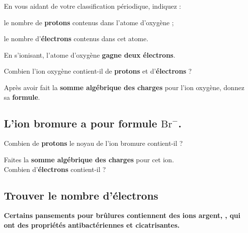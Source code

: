 \documentclass[a4paper,12pt]{article}
\begin{document}
\begin{compactitem}
  \item En vous aidant de votre classification périodique, indiquez :
  \begin{compactitem}
    \item le nombre de \textbf{protons} contenus dans l’atome d’oxygène ;
    \item le nombre d’\textbf{électrons} contenus dans cet atome.
  \end{compactitem}

  \item En s’ionisant, l’atome d’oxygène \textbf{gagne deux électrons}.
  \begin{compactitem}
    \item Combien l’ion oxygène contient-il de \textbf{protons} et d’\textbf{électrons} ?
    \item Après avoir fait la \textbf{somme algébrique des charges} pour l’ion oxygène, donnez sa \textbf{formule}.
  \end{compactitem}
\end{compactitem}

\subsection*{L’ion bromure a pour formule $\mathrm{Br}^-$.}

\begin{compactitem}
  \item Combien de \textbf{protons} le noyau de l’ion bromure contient-il ?
  \item Faites la \textbf{somme algébrique des charges} pour cet ion.\\
  Combien d’\textbf{électrons} contient-il ?
\end{compactitem}

\subsection*{Trouver le nombre d'électrons}

\textbf{Certains pansements pour brûlures contiennent des ions argent, , qui ont des propriétés antibactériennes et cicatrisantes.}
\end{document}
